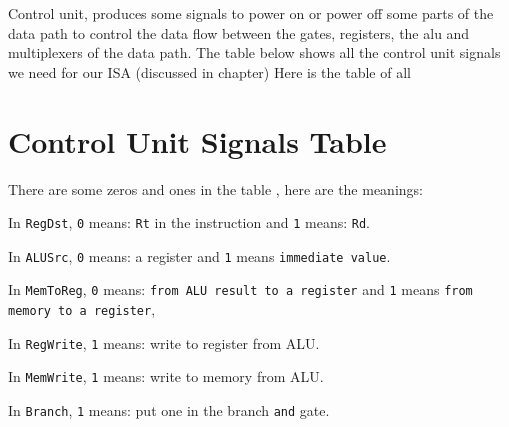 \documentclass[12pt, dvipsnames, svgnames, x11names, oneside]{book}
\begin{document}
		Control unit, produces some signals to power on or power off some parts of the data path to control the data flow between the gates, registers, the alu and multiplexers of the data path. The table below shows all the control unit signals we need for our ISA (discussed in  chapter)
		Here is the table of all 
		
		\section{Control Unit Signals Table}
		
		There are some zeros and ones in the table , here are the meanings:
		
		In \texttt{RegDst}, \texttt{0} means: \texttt{Rt} in the instruction and \texttt{1} means: \texttt{Rd}.
		
		In \texttt{ALUSrc}, \texttt{0} means: a register and \texttt{1} means \texttt{immediate value}.
		
		In \texttt{MemToReg}, \texttt{0} means: \texttt{from ALU result to a register} and \texttt{1} means \texttt{from memory to a register},
		
		In \texttt{RegWrite}, \texttt{1} means: write to register from ALU.
		
		In \texttt{MemWrite}, \texttt{1} means: write to memory from ALU.
		
		In \texttt{Branch}, \texttt{1} means: put one in the branch \texttt{and} gate.
		
\end{document}
